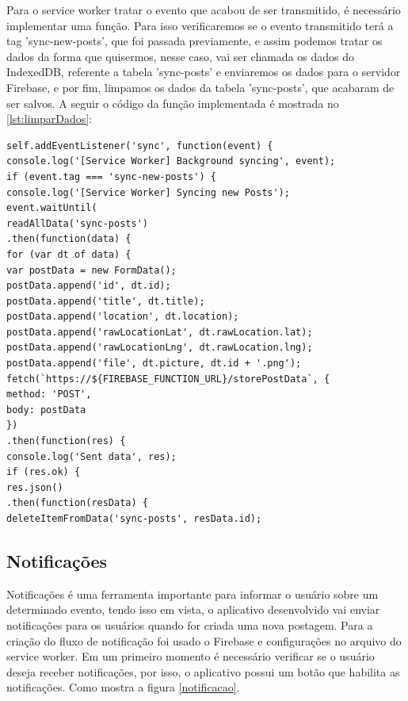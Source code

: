 Para o service worker tratar o evento que acabou de ser transmitido, é necessário implementar uma função. Para isso verificaremos se o evento transmitido terá a tag 'sync-new-posts', que foi passada previamente, e assim podemos tratar os dados da forma que quisermos, nesse caso, vai ser chamada os dados do IndexedDB, referente a tabela 'sync-posts' e enviaremos os dados para o servidor Firebase, e por fim, limpamos os dados da tabela 'sync-posts', que acabaram de ser salvos. A seguir o código da função implementada é mostrada no \autoref{lst:limparDados}:

\begin{lstlisting}[frame=single,label=lst:limparDados,caption=Limpando Dados, basicstyle=\footnotesize]
self.addEventListener('sync', function(event) {
console.log('[Service Worker] Background syncing', event);
if (event.tag === 'sync-new-posts') {
console.log('[Service Worker] Syncing new Posts');
event.waitUntil(
readAllData('sync-posts')
.then(function(data) {
for (var dt of data) {
var postData = new FormData();
postData.append('id', dt.id);
postData.append('title', dt.title);
postData.append('location', dt.location);
postData.append('rawLocationLat', dt.rawLocation.lat);
postData.append('rawLocationLng', dt.rawLocation.lng);
postData.append('file', dt.picture, dt.id + '.png');
fetch(`https://${FIREBASE_FUNCTION_URL}/storePostData`, {
method: 'POST',
body: postData
})
.then(function(res) {
console.log('Sent data', res);
if (res.ok) {
res.json()
.then(function(resData) {
deleteItemFromData('sync-posts', resData.id);

\end{lstlisting}
\vspace{-0.75cm}
\begin{center}
\end{center}

\subsection*{Notificações}
Notificações é uma ferramenta importante para informar o usuário sobre um determinado evento, tendo isso em vista, o aplicativo desenvolvido vai enviar notificações para os usuários quando for criada uma nova postagem. Para a criação do fluxo de notificação foi usado o Firebase e configurações no arquivo do service worker. Em um primeiro momento é necessário verificar se o usuário deseja receber notificações, por isso, o aplicativo possui um botão que habilita as notificações. Como mostra a figura \autoref{notificacao}.

